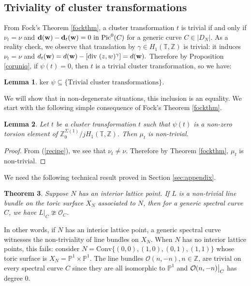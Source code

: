 \documentclass[11pt]{article} %
\newtheorem{theorem}{Theorem}[section]
\newtheorem{lemma}[theorem]{Lemma}
\theoremstyle{definition}
\newcommand{\Z}{{\mathbb Z}}
\newcommand{\T}{{\mathbb T}}
\renewcommand{\P}{{\mathbb P}}
\newcommand\restr[2]{{%
  \left.\kern-\nulldelimiterspace %
  #1 %
  \vphantom{\big|} %
  \right|_{#2} %
  }}
\newcommand{\la}{\label}
\begin{document}
\subsection{Triviality of cluster transformations} \la{sec:triv}

From Fock's Theorem \ref{fockthm}, a cluster transformation $t$ is trivial if and only if $\nu_t=\nu$ and ${\bf d}({\bf w})-{\bf d}_t({\bf w}) = 0 \text{ in Pic}^0(C)$ for a generic curve $C \in |D_N|$. As a reality check, we observe that translation by $\gamma \in H_1(\T,\Z)$ is trivial: it induces $\nu_t=\nu$ and $d_t({\bf w})= d({\bf w})-[\text{div }(z,w)^\gamma] = d({\bf w}).$  Therefore by Proposition \ref{coruniq}, if $\psi(t)=0$, then $t$ is a trivial cluster transformation, so we have: 

\begin{lemma}
$\text{ker }\psi \subseteq \{\text{Trivial cluster transformations} \}$. 
\end{lemma}




We will show that in non-degenerate situations, this inclusion is an equality. We start with the following simple consequence of Fock's Theorem \ref{fockthm}.
\begin{lemma}\label{torlem}
Let $t$ be a cluster transformation $t$ such that $\psi(t)$ is a non-zero torsion element of $\Z_0^{\Sigma(1)}/jH_1(\T,\Z)$. Then $\mu_t$ is non-trivial.
\end{lemma}
\begin{proof}
From (\ref{recipe}), we see that $\nu_t \neq \nu$. Therefore by Theorem \ref{fockthm}, $\mu_t$ is non-trivial.
\end{proof}

We need the following technical result proved in Section \ref{sec:appendix}.
\begin{theorem}\la{theorem:appendix1}
Suppose $N$ has an interior lattice point. If $L$ is a non-trivial line bundle on the toric surface $X_N$ associated to $N$, then for a generic spectral curve $C$, we have $L|_C \ncong \mathcal O_C$. 
\end{theorem}
In other words, if $N$ has an interior lattice point, a generic spectral curve witnesses the non-triviality of line bundles on $X_N$. When $N$ has no interior lattice points, this fails: consider $N=\text{Conv}\{(0,0),(1,0),(0,1),(1,1)\}$ whose toric surface is $X_N = \P^1 \times \P^1$. The line bundles $\mathcal O(n,-n), n \in \Z$, are trivial on every spectral curve $C$ since they are all isomorphic to $\P^1$ and $\restr{\mathcal O(n,-n)}{C}$ has degree $0$.%
\end{document}
